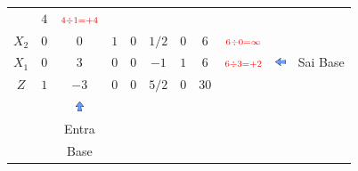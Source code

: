 \begin{frame}
{\begin{table}
\begin{tabular}{c c c c c c c c c c c}
				& \cellcolor{gray!50} $\scriptstyle 4$
				& $\scriptstyle  \color{red} 4 \div 1 = +4$
				& 
				& \\
				\cline{1-8} 
			    \cellcolor{blue!100} \color{red} $\scriptstyle X_2$
				& \cellcolor{yellow!50} $\scriptstyle 0$
				& \cellcolor{gray!50} $\scriptstyle 0$
				& \cellcolor{yellow!50} $\scriptstyle 1$
				& \cellcolor{yellow!50} $\scriptstyle 0$			
				& \cellcolor{yellow!50} $\scriptstyle 1/2$
				& \cellcolor{yellow!50} $\scriptstyle 0$
				& \cellcolor{gray!50} $\scriptstyle 6$
				& $\scriptstyle  \color{red} 6 \div 0 = \infty$
				&
				& \\
				\cline{1-8} 
				\cellcolor{blue!100} \color{red} $\scriptstyle X_1$
				& \cellcolor{gray!50} $\scriptstyle 0$
				& \cellcolor{red!50} $\scriptstyle 3$
				& \cellcolor{gray!50} $\scriptstyle 0$
				& \cellcolor{gray!50} $\scriptstyle 0$
				& \cellcolor{gray!50} $\scriptstyle -1$
				& \cellcolor{gray!50} $\scriptstyle 1$
				& \cellcolor{gray!50} $\scriptstyle 6$
				& $\scriptstyle  \color{red} 6 \div 3 = +2$
				& \includegraphics[width=0.3cm,height=0.3cm]{setaesquerda.jpg}
				& \scriptsize \color{red} Sai Base\\
				\cline{1-8}
				\cellcolor{blue!100} \color{white} $\scriptstyle Z$
				& \cellcolor{yellow!50} $\scriptstyle 1$
				& \cellcolor{gray!50} $\scriptstyle -3$
				& \cellcolor{yellow!50} $\scriptstyle 0$
				& \cellcolor{yellow!50} $\scriptstyle 0$
				& \cellcolor{yellow!50} $\scriptstyle 5/2$
				& \cellcolor{yellow!50} $\scriptstyle 0$
				& \cellcolor{gray!50} $\scriptstyle 30$ 
				&
				&
				& \\
				\cline{1-8}
				& 
				& \includegraphics[width=0.3cm,height=0.3cm]{setacima.jpg}
				& 
				& 
				& 
				& 
				&  
				&
				&
				& \\ 
				& 
				& \scriptsize \color{red} Entra
				&  
				& 
				& 
				& 
				&  
				&
				&
				& \\
				& 
				& \scriptsize \color{red} Base
				&  
				& 
				& 
				& 
				&  
				&
				&
				& \\
			\end{tabular}
		\end{table}			
	}	
	{		
		\begin{table}		
			\begin{tabular}{c c c c c c c c c c c}

\end{tabular}
\end{table}}
\end{frame}
